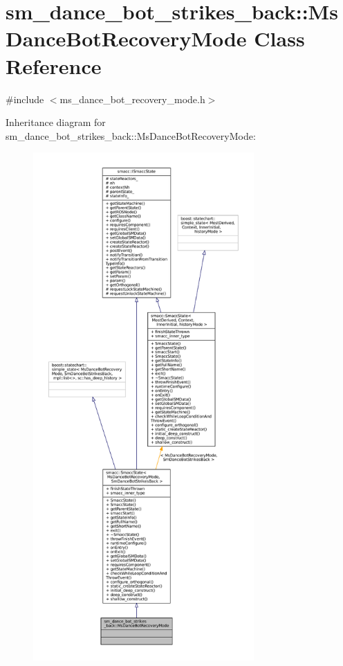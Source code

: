 \hypertarget{classsm__dance__bot__strikes__back_1_1MsDanceBotRecoveryMode}{}\section{sm\+\_\+dance\+\_\+bot\+\_\+strikes\+\_\+back\+:\+:Ms\+Dance\+Bot\+Recovery\+Mode Class Reference}
\label{classsm__dance__bot__strikes__back_1_1MsDanceBotRecoveryMode}


{\ttfamily \#include $<$ms\+\_\+dance\+\_\+bot\+\_\+recovery\+\_\+mode.\+h$>$}



Inheritance diagram for sm\+\_\+dance\+\_\+bot\+\_\+strikes\+\_\+back\+:\+:Ms\+Dance\+Bot\+Recovery\+Mode\+:
\nopagebreak
\begin{figure}[H]
\begin{center}
\leavevmode
\includegraphics[height=550pt]{classsm__dance__bot__strikes__back_1_1MsDanceBotRecoveryMode__inherit__graph}
\end{center}
\end{figure}


